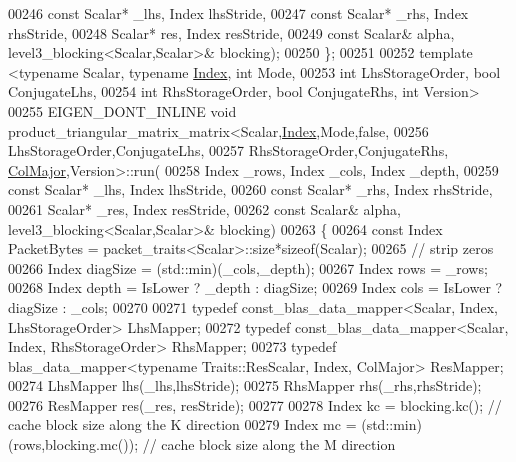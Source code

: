 \begin{DoxyCode}
00246     \textcolor{keyword}{const} Scalar* \_lhs, Index lhsStride,
00247     \textcolor{keyword}{const} Scalar* \_rhs, Index rhsStride,
00248     Scalar* res,        Index resStride,
00249     \textcolor{keyword}{const} Scalar& alpha, level3\_blocking<Scalar,Scalar>& blocking);
00250 \};
00251 
00252 \textcolor{keyword}{template} <\textcolor{keyword}{typename} Scalar, \textcolor{keyword}{typename} \hyperlink{namespace_eigen_a62e77e0933482dafde8fe197d9a2cfde}{Index}, \textcolor{keywordtype}{int} Mode,
00253           \textcolor{keywordtype}{int} LhsStorageOrder, \textcolor{keywordtype}{bool} ConjugateLhs,
00254           \textcolor{keywordtype}{int} RhsStorageOrder, \textcolor{keywordtype}{bool} ConjugateRhs, \textcolor{keywordtype}{int} Version>
00255 EIGEN\_DONT\_INLINE \textcolor{keywordtype}{void} product\_triangular\_matrix\_matrix<Scalar,\hyperlink{namespace_eigen_a62e77e0933482dafde8fe197d9a2cfde}{Index},Mode,\textcolor{keyword}{false},
00256                                                         LhsStorageOrder,ConjugateLhs,
00257                                                         RhsStorageOrder,ConjugateRhs,
      \hyperlink{group__enums_ggaacded1a18ae58b0f554751f6cdf9eb13a0cbd4bdd0abcfc0224c5fcb5e4f6669a}{ColMajor},Version>::run(
00258     Index \_rows, Index \_cols, Index \_depth,
00259     \textcolor{keyword}{const} Scalar* \_lhs, Index lhsStride,
00260     \textcolor{keyword}{const} Scalar* \_rhs, Index rhsStride,
00261     Scalar* \_res,        Index resStride,
00262     \textcolor{keyword}{const} Scalar& alpha, level3\_blocking<Scalar,Scalar>& blocking)
00263   \{
00264     \textcolor{keyword}{const} Index PacketBytes = packet\_traits<Scalar>::size*\textcolor{keyword}{sizeof}(Scalar);
00265     \textcolor{comment}{// strip zeros}
00266     Index diagSize  = (std::min)(\_cols,\_depth);
00267     Index rows      = \_rows;
00268     Index depth     = IsLower ? \_depth : diagSize;
00269     Index cols      = IsLower ? diagSize : \_cols;
00270     
00271     \textcolor{keyword}{typedef} const\_blas\_data\_mapper<Scalar, Index, LhsStorageOrder> LhsMapper;
00272     \textcolor{keyword}{typedef} const\_blas\_data\_mapper<Scalar, Index, RhsStorageOrder> RhsMapper;
00273     \textcolor{keyword}{typedef} blas\_data\_mapper<typename Traits::ResScalar, Index, ColMajor> ResMapper;
00274     LhsMapper lhs(\_lhs,lhsStride);
00275     RhsMapper rhs(\_rhs,rhsStride);
00276     ResMapper res(\_res, resStride);
00277 
00278     Index kc = blocking.kc();                   \textcolor{comment}{// cache block size along the K direction}
00279     Index mc = (std::min)(rows,blocking.mc());  \textcolor{comment}{// cache block size along the M direction}

\end{DoxyCode}
